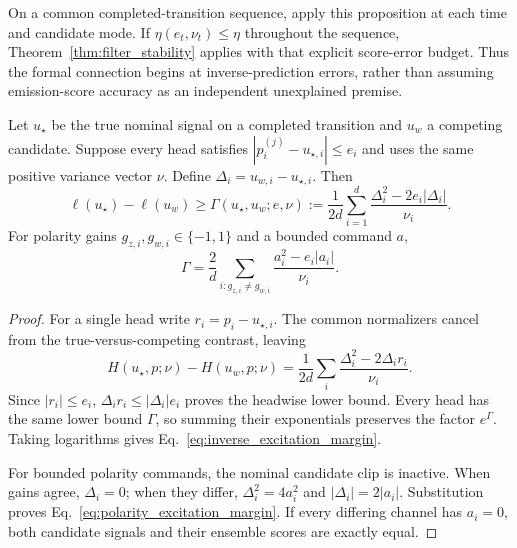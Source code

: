 On a common completed-transition sequence, apply this proposition at each time and candidate mode.
If $\eta(e_t,\nu_t)\le\eta$ throughout the sequence, Theorem~\ref{thm:filter_stability} applies with that explicit score-error budget.
Thus the formal connection begins at inverse-prediction errors, rather than assuming emission-score accuracy as an independent unexplained premise.

\begin{proposition}
\label{prop:inverse_excitation}
Let $u_\star$ be the true nominal signal on a completed transition and $u_w$ a competing candidate.
Suppose every head satisfies $|p_i^{(j)}-u_{\star,i}|\le e_i$ and uses the same positive variance vector $\nu$.
Define $\Delta_i=u_{w,i}-u_{\star,i}$. Then
\begin{equation}
 \ell(u_\star)-\ell(u_w)\ge
 \Gamma(u_\star,u_w;e,\nu):=
 \frac{1}{2d}\sum_{i=1}^d
 \frac{\Delta_i^2-2e_i|\Delta_i|}{\nu_i}.
 \label{eq:inverse_excitation_margin}
\end{equation}
For polarity gains $g_{z,i},g_{w,i}\in\{-1,1\}$ and a bounded command $a$,
\begin{equation}
 \Gamma=\frac{2}{d}\sum_{i:g_{z,i}\ne g_{w,i}}
 \frac{a_i^2-e_i|a_i|}{\nu_i}.
 \label{eq:polarity_excitation_margin}
\end{equation}
\end{proposition}

\begin{proof}
For a single head write $r_i=p_i-u_{\star,i}$.
The common normalizers cancel from the true-versus-competing contrast, leaving
\begin{equation}
 H(u_\star,p;\nu)-H(u_w,p;\nu)
 =\frac{1}{2d}\sum_i\frac{\Delta_i^2-2\Delta_i r_i}{\nu_i}.
\end{equation}
Since $|r_i|\le e_i$, $\Delta_i r_i\le|\Delta_i|e_i$ proves the headwise lower bound.
Every head has the same lower bound $\Gamma$, so summing their exponentials preserves the factor $e^\Gamma$.
Taking logarithms gives Eq.~\eqref{eq:inverse_excitation_margin}.

For bounded polarity commands, the nominal candidate clip is inactive.
When gains agree, $\Delta_i=0$; when they differ, $\Delta_i^2=4a_i^2$ and $|\Delta_i|=2|a_i|$.
Substitution proves Eq.~\eqref{eq:polarity_excitation_margin}.
If every differing channel has $a_i=0$, both candidate signals and their ensemble scores are exactly equal.
\end{proof}

